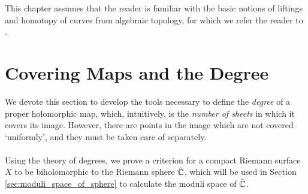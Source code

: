 \documentclass[../Moduli_Spaces_of_Riemann_Surfaces.tex]{subfiles}
\begin{document}
    This chapter assumes that the reader is familiar with the basic notions of liftings and homotopy of curves from algebraic topology, for which we refer the reader to \cite[][Chapter 1]{hatcher}.
    \section{Covering Maps and the Degree}
    We devote this section to develop the tools necessary to define the \textit{degree} of a proper holomorphic map, which, intuitively, is the \textit{number of sheets} in which it covers its image. However, there are points in the image which are not covered `uniformly', and they must be taken care of separately.\\\ \\
    Using the theory of degrees, we prove a criterion for a compact Riemann surface $X$ to be biholomorphic to the Riemann sphere $\hat{\mathbb{C}}$, which will be used in Section \ref{sec:moduli_space_of_sphere} to calculate the moduli space of $\hat{\mathbb{C}}$.
\end{document}
